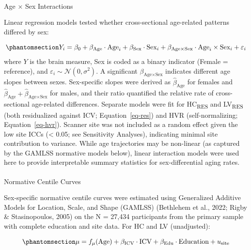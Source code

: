 \documentclass[
]{article}
\makeatletter
\let\oldparagraph\paragraph
\renewcommand{\paragraph}{
    \@ifstar
      \xxxParagraphStar
      \xxxParagraphNoStar
  }
\newcommand{\xxxParagraphStar}[1]{\oldparagraph*{#1}\mbox{}}
\newcommand{\xxxParagraphNoStar}[1]{\oldparagraph{#1}\mbox{}}
\makeatother
\begin{document}
\paragraph{Age × Sex Interactions}\label{age-sex-interactions}

Linear regression models tested whether cross-sectional age-related
patterns differed by sex:

\begin{equation}\phantomsection\label{eq-age-sex}{Y_i = \beta_0 + \beta_{\text{Age}} \cdot \text{Age}_i + \beta_{\text{Sex}} \cdot \text{Sex}_i + \beta_{\text{Age} \times \text{Sex}} \cdot \text{Age}_i \times \text{Sex}_i + \varepsilon_i}\end{equation}
where \(Y\) is the brain measure, Sex is coded as a binary indicator
(Female = reference), and
\(\varepsilon_i \sim \mathcal{N}(0, \sigma^2)\). A significant
\(\beta_{\text{Age} \times \text{Sex}}\) indicates different age slopes
between sexes. Sex-specific slopes were derived as
\(\hat{\beta}_{\text{Age}}\) for females and
\(\hat{\beta}_{\text{Age}} + \hat{\beta}_{\text{Age} \times \text{Sex}}\)
for males, and their ratio quantified the relative rate of
cross-sectional age-related differences. Separate models were fit for
HC\textsubscript{RES} and LV\textsubscript{RES} (both residualized
against ICV; Equation~\ref{eq-res}) and HVR (self-normalizing;
Equation~\ref{eq-hvr}). Scanner site was not included as a random effect
given the low site ICCs (\textless{} 0.05; see Sensitivity Analyses),
indicating minimal site contribution to variance. While age trajectories
may be non-linear (as captured by the GAMLSS normative models below),
linear interaction models were used here to provide interpretable
summary statistics for sex-differential aging rates.

\paragraph{Normative Centile Curves}\label{normative-centile-curves}

Sex-specific normative centile curves were estimated using Generalized
Additive Models for Location, Scale, and Shape (GAMLSS) (Bethlehem et
al., 2022; Rigby \& Stasinopoulos, 2005) on the N = 27,434 participants
from the primary sample with complete education and site data. For HC
and LV (unadjusted):

\begin{equation}\phantomsection\label{eq-gamlss-hc}{\mu = f_\mu(\text{Age}) + \beta_{\text{ICV}} \cdot \text{ICV} + \beta_{\text{Edu}} \cdot \text{Education} + u_{\text{site}}}\end{equation}
\end{document}
